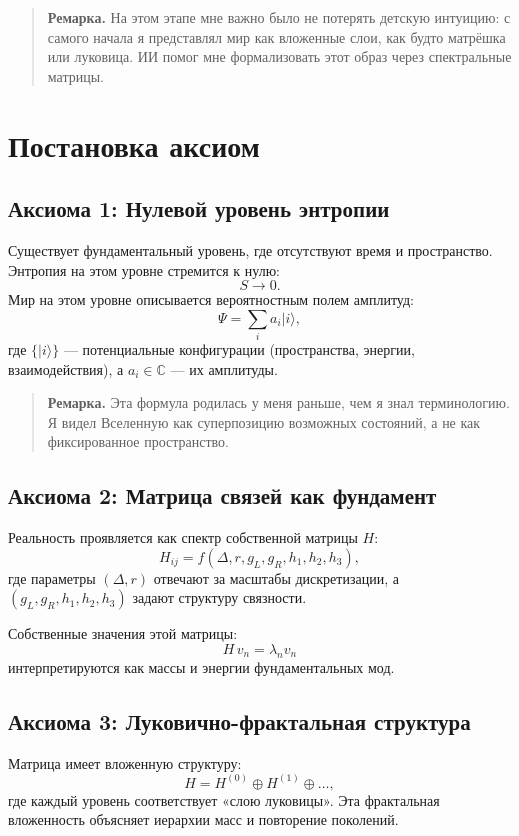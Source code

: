 \documentclass[12pt,a4paper]{article}
\begin{document}
\begin{quote}
\textbf{Ремарка.}  
На этом этапе мне важно было не потерять детскую интуицию: с самого начала я представлял мир как вложенные слои, как будто матрёшка или луковица. 
ИИ помог мне формализовать этот образ через спектральные матрицы.
\end{quote}

\section{Постановка аксиом}
\subsection{Аксиома 1: Нулевой уровень энтропии}
Существует фундаментальный уровень, где отсутствуют время и пространство.  
Энтропия на этом уровне стремится к нулю:
\[
S \to 0.
\]
Мир на этом уровне описывается вероятностным полем амплитуд:
\[
\Psi = \sum_{i} a_i |i\rangle , 
\]
где $\{|i\rangle\}$ — потенциальные конфигурации (пространства, энергии, взаимодействия), а $a_i \in \mathbb{C}$ — их амплитуды.

\begin{quote}
\textbf{Ремарка.}  
Эта формула родилась у меня раньше, чем я знал терминологию. 
Я видел Вселенную как суперпозицию возможных состояний, а не как фиксированное пространство.
\end{quote}

\subsection{Аксиома 2: Матрица связей как фундамент}
Реальность проявляется как спектр собственной матрицы $H$:
\[
H_{ij} = f(\Delta, r, g_L, g_R, h_1,h_2,h_3),
\]
где параметры $(\Delta, r)$ отвечают за масштабы дискретизации, 
а $(g_L,g_R,h_1,h_2,h_3)$ задают структуру связности.

Собственные значения этой матрицы:
\[
H \, v_n = \lambda_n v_n
\]
интерпретируются как массы и энергии фундаментальных мод.

\subsection{Аксиома 3: Луковично-фрактальная структура}
Матрица имеет вложенную структуру:
\[
H = H^{(0)} \oplus H^{(1)} \oplus \dots,
\]
где каждый уровень соответствует «слою луковицы».  
Эта фрактальная вложенность объясняет иерархии масс и повторение поколений.
\end{document}
